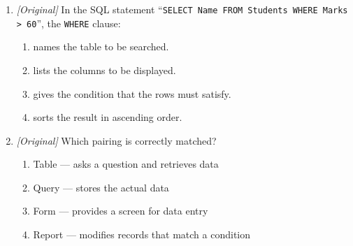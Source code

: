 \documentclass[11pt]{article}
\begin{document}
\begin{enumerate}[label=\textbf{Q\arabic*.}, leftmargin=*]
\begin{enumerate}[label=\Alph*.]
  \end{enumerate}
\item \textit{[Original]} In the SQL statement
  ``\texttt{SELECT Name FROM Students WHERE Marks > 60}'', the
  \texttt{WHERE} clause:
  \begin{enumerate}[label=\Alph*.]
    \item names the table to be searched.
    \item lists the columns to be displayed.
    \item gives the condition that the rows must satisfy.
    \item sorts the result in ascending order.
  \end{enumerate}
\item \textit{[Original]} Which pairing is correctly matched?
  \begin{enumerate}[label=\Alph*.]
    \item Table --- asks a question and retrieves data
    \item Query --- stores the actual data
    \item Form --- provides a screen for data entry
    \item Report --- modifies records that match a condition
  \end{enumerate}


\end{enumerate}
\end{document}
